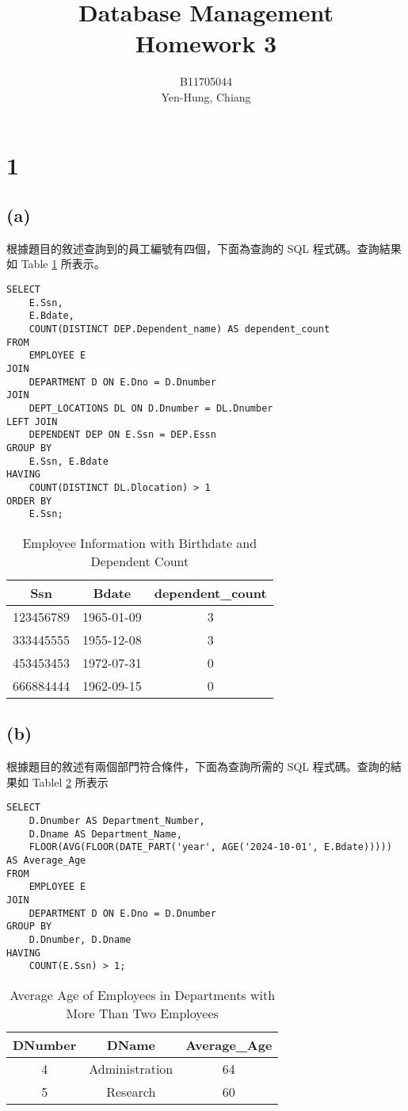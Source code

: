 \documentclass{article}
\title{Database Management\\Homework 3}
\author{B11705044 \\ Yen-Hung, Chiang}
\date{}
\begin{document}
\maketitle

\section*{1}
\subsection*{(a)}
根據題目的敘述查詢到的員工編號有四個，下面為查詢的 SQL 程式碼。查詢結果如 Table \ref{table:1_a} 所表示。
\begin{verbatim}
SELECT 
    E.Ssn, 
    E.Bdate, 
    COUNT(DISTINCT DEP.Dependent_name) AS dependent_count
FROM 
    EMPLOYEE E
JOIN 
    DEPARTMENT D ON E.Dno = D.Dnumber 
JOIN 
    DEPT_LOCATIONS DL ON D.Dnumber = DL.Dnumber 
LEFT JOIN 
    DEPENDENT DEP ON E.Ssn = DEP.Essn 
GROUP BY 
    E.Ssn, E.Bdate
HAVING 
    COUNT(DISTINCT DL.Dlocation) > 1
ORDER BY
    E.Ssn;
\end{verbatim}
\begin{table}[H]
\centering
\begin{tabular}{ccc}
\toprule
Ssn & Bdate & dependent\_count \\
\midrule
123456789 & 1965-01-09 & 3 \\
333445555 & 1955-12-08 & 3 \\
453453453 & 1972-07-31 & 0 \\
666884444 & 1962-09-15 & 0 \\
\bottomrule
\end{tabular}
\caption{Employee Information with Birthdate and Dependent Count}
\label{table:1_a}
\end{table}



\subsection*{(b)}
根據題目的敘述有兩個部門符合條件，下面為查詢所需的 SQL 程式碼。查詢的結果如 Tablel \ref{table:1_b} 所表示
\begin{verbatim}
SELECT
    D.Dnumber AS Department_Number,  
    D.Dname AS Department_Name,
    FLOOR(AVG(FLOOR(DATE_PART('year', AGE('2024-10-01', E.Bdate))))) AS Average_Age
FROM
    EMPLOYEE E
JOIN
    DEPARTMENT D ON E.Dno = D.Dnumber
GROUP BY
    D.Dnumber, D.Dname
HAVING 
    COUNT(E.Ssn) > 1;
\end{verbatim}
\begin{table}[H]
\centering
\begin{tabular}{ccc}
\toprule
DNumber & DName & Average\_Age \\
\midrule
4 & Administration & 64 \\
5 & Research & 60 \\
\bottomrule
\end{tabular}
\caption{Average Age of Employees in Departments with More Than Two Employees}
\label{table:1_b}
\end{table}
\end{document}
